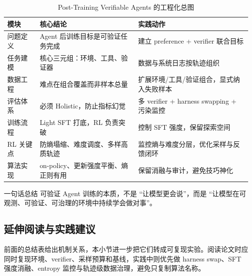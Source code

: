 \documentclass[a4paper]{article}
\begin{document}
\begin{table}[H]
\centering
\begin{tabular}{p{2.6cm}p{4.2cm}p{4.1cm}}
\toprule
\textbf{模块} & \textbf{核心结论} & \textbf{实践动作} \\
\midrule
问题定义 & Agent 后训练目标是可验证任务完成 & 建立 preference + verifier 联合目标 \\
任务建模 & 核心三元组：环境、工具、验证器 & 数据与系统日志按轨迹组织 \\
数据工程 & 难点在组合覆盖而非样本总量 & 扩展环境/工具/验证组合，显式纳入失败样本 \\
评估体系 & 必须 Holistic，防止指标幻觉 & 多 verifier + harness swapping + 污染监控 \\
训练流程 & Light SFT 打底，RL 负责突破 & 控制 SFT 强度，保留探索空间 \\
RL 关键点 & 防熵塌缩、难度调度、多样高质轨迹 & 监控熵与难度分层，优化采样与反馈闭环 \\
算法实现 & on-policy、更新强度平衡、熵正则有用 & 保留消融与审计，避免技巧神化 \\
\bottomrule
\end{tabular}
\caption{Post-Training Verifiable Agents 的工程化总图}
\end{table}

\begin{importantbox}{一句话总结}
可验证 Agent 训练的本质，不是 ``让模型更会说''，而是 ``让模型在可观测、可验证、可治理的环境中持续学会做对事''。
\end{importantbox}

\subsection{延伸阅读与实践建议}

前面的总结表给出机制关系，本小节进一步把它们转成可复现实验。阅读论文时应同时复现环境、verifier、采样预算和基线，实践中则优先做 harness swap、SFT 强度消融、entropy 监控与轨迹级数据治理，避免只复制算法名称。
\end{document}
